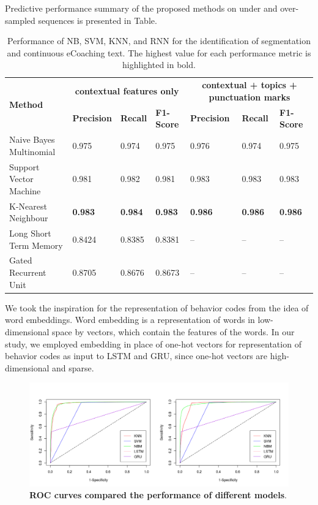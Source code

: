 \documentclass{amia}
\begin{document}
Predictive performance summary of the proposed methods on under and over-sampled sequences is presented in Table.\\

\begin{table}[ht]
\centering
\caption{Performance of NB, SVM, KNN, and RNN for the identification of segmentation and continuous eCoaching text. The highest value for each performance metric is highlighted in bold.}
\label{tab:result_under_over_sampled}
  \begin{tabular}{|l|l|l|l|l|l|l|}
  \hline
   \multirow{2}{*}{\textbf{Method}} & \multicolumn{3}{|c|}{\textbf{contextual features only}} & \multicolumn{3}{|c|}{\textbf{contextual + topics + punctuation marks}} \\\cline{2-7}
   & \textbf{Precision}  & \textbf{Recall} & \textbf{F1-Score} & \textbf{Precision}  & \textbf{Recall} & \textbf{F1-Score}\\ \hline    
    
 Naive Bayes Multinomial & 0.975 & 0.974 & 0.975 & 0.976 & 0.974 & 0.975 \\ \hline
 Support Vector Machine & 0.981 & 0.982 & 0.981 & 0.983 & 0.983 & 0.983\\ \hline
 K-Nearest Neighbour & \textbf{0.983} & \textbf{0.984} & \textbf{0.983} & \textbf{0.986} & \textbf{0.986} & \textbf{0.986}\\ \hline
 Long Short Term Memory & 0.8424 & 0.8385 & 0.8381 & -- & -- & --\\ \hline
 Gated Recurrent Unit & 0.8705 & 0.8676 & 0.8673 & -- & -- & --\\ \hline 
  \end{tabular}
\end{table} 

We took the inspiration for the representation of behavior codes from the idea of word embeddings. Word embedding is a representation of words in
low-dimensional space by vectors, which contain the features of the words. In our study, we employed embedding in place of one-hot vectors for representation of behavior codes as input to LSTM and GRU, since one-hot vectors are high-dimensional and sparse. 

\begin{figure}[!htb]
    \centering
    \includegraphics[width=1.0\textwidth]{figures/roc-curves.png}
    \caption{\textbf{ROC curves compared the performance of different models}.}
    \label{fig:roc-curves}
\end{figure}
\end{document}
